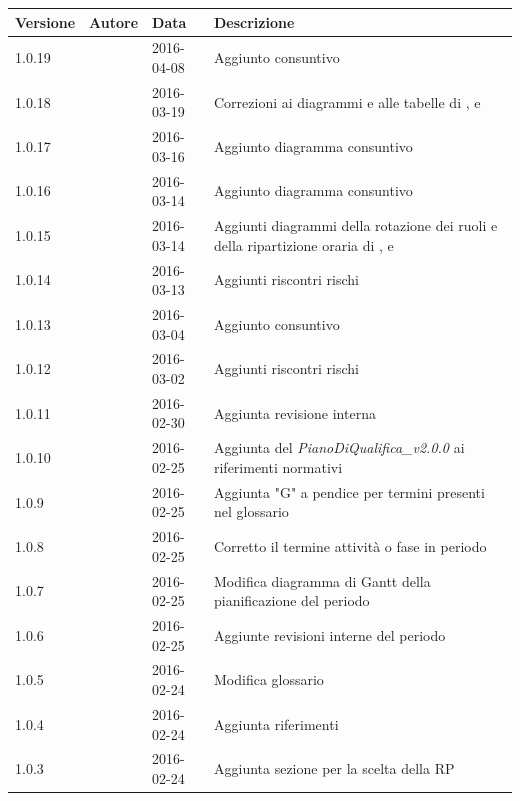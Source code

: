 \documentclass[12pt,a4paper]{article}
\begin{document}
\begin{center}
	\begin{longtable}[H]{p{} p{} p{} p{}}
		\toprule
		\textbf{Versione}	&	\textbf{Autore}	&	\textbf{Data}	&	\textbf{Descrizione}\\*
		\midrule
		\midrule
		1.0.19 & \AB{} & 2016-04-08 & Aggiunto consuntivo \FPA{} \\*
		\midrule
		1.0.18 & \AB{} & 2016-03-19 & Correzioni ai diagrammi e alle tabelle di \FAD, \FPA e \FPD{} \\*
		\midrule
		1.0.17 & \AB{} & 2016-03-16 & Aggiunto diagramma consuntivo \FPA \\*
		\midrule
		1.0.16 & \AB{} & 2016-03-14 & Aggiunto diagramma consuntivo \FAD \\*
		\midrule
	    1.0.15 & \AB{} & 2016-03-14 & Aggiunti diagrammi della rotazione dei ruoli e della ripartizione oraria di \FAD, \FPA e \FPD{} \\*
        \midrule
        1.0.14 & \AB{} & 2016-03-13 & Aggiunti riscontri rischi \FPA{} \\*
        \midrule
        1.0.13 & \AB{} & 2016-03-04 & Aggiunto consuntivo \FAD{} \\*
        \midrule
        1.0.12 & \AB{} & 2016-03-02 & Aggiunti riscontri rischi \FAD{} \\*
        \midrule
        1.0.11 & \AB{} & 2016-02-30 & Aggiunta revisione interna \\*
		\midrule
		1.0.10 & \AVE{} & 2016-02-25 & Aggiunta del \textit{PianoDiQualifica\_v2.0.0} ai riferimenti normativi \\*		
		\midrule
		1.0.9 & \AVE{} & 2016-02-25 & Aggiunta "G" a pendice per termini presenti nel glossario \\*
		\midrule
		1.0.8 & \AVE{} & 2016-02-25 & Corretto il termine attività o fase in periodo \\*
		\midrule
		1.0.7 & \AB{} & 2016-02-25 & Modifica diagramma di Gantt della pianificazione del periodo \FP\  \\*
		\midrule
		1.0.6 & \AB{} & 2016-02-25 & Aggiunte revisioni interne del periodo \FP\ \\*
		\midrule
		1.0.5 & \AB{} & 2016-02-24 & Modifica glossario \\*
		\midrule
		1.0.4 & \AB{} & 2016-02-24 & Aggiunta riferimenti \\*
		\midrule
		1.0.3 & \TP{} & 2016-02-24 & Aggiunta sezione per la scelta della RP \\*

\end{longtable}
\end{center}
\end{document}
